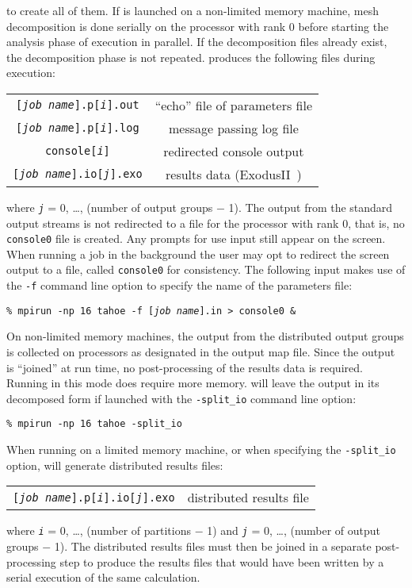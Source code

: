 to create all of them.  If \tahoe is launched on a non-limited memory
machine, mesh decomposition is done serially on the processor with rank 0
before starting the analysis phase of execution in parallel.  If the
decomposition files already exist, the decomposition phase is not repeated. 
\tahoe produces the following files during execution:
\begin{center}
\begin{tabular}[c]{c c}
 \parbox[b]{3.0in}{\raggedleft \texttt{[\textsl{job name}].p[\textsl{i}].out}}
&\parbox[b]{3.0in}{``echo'' file of parameters file}\\
 \parbox[b]{3.0in}{\raggedleft \texttt{[\textsl{job nam}e].p[\textsl{i}].log}}
&\parbox[b]{3.0in}{message passing log file}\\
 \parbox[b]{3.0in}{\raggedleft \texttt{console[\textsl{i}]}}
&\parbox[b]{3.0in}{redirected console output}\\
 \parbox[b]{3.0in}{\raggedleft \texttt{[\textsl{job name}].io[\textsl{j}].exo}}
&\parbox[b]{3.0in}{results data (\textsf{ExodusII}~\cite{ExodusII})}
\end{tabular}
\end{center}
where \texttt{\textsl{j}} = 0, \ldots, (number of output groups $-$ 1).  
The output from the
standard output streams is not redirected to a file for the processor with
rank 0, that is, no \texttt{console0} file is created.  Any prompts for use input
still appear on the screen.  When running a job in the background the user
may opt to redirect the screen output to a file, called \texttt{console0} for
consistency.  The following input makes use of the \texttt{-f} command line option
to specify the name of the parameters file:
\begin{center}
\texttt{\% mpirun -np 16 tahoe -f [\textsl{job name}].in \textgreater~console0 \&}
\end{center}
On non-limited memory machines, the output from the distributed output
groups is collected on processors as designated in the output map file. 
Since the output is ``joined'' at run time, no post-processing of the results
data is required.  Running \tahoe in this mode does require more memory. 
\tahoe will leave the output in its decomposed form if launched with the
\texttt{-split\_io} command line option:
\begin{center}
\texttt{\% mpirun -np 16 tahoe -split\_io}
\end{center}
When running on a limited memory machine, or when specifying the 
\texttt{-split\_io}
option, \tahoe will generate distributed results files:
\begin{center}
\begin{tabular}[c]{c c}
 \parbox[b]{3.0in}{\raggedleft \texttt{[\textsl{job name}].p[\textsl{i}].io[\textsl{j}].exo}}
&\parbox[b]{3.0in}{distributed results file}
\end{tabular}
\end{center}
where \texttt{\textsl{i}} = 0, \ldots, (number of partitions $-$ 1) and 
\texttt{\textsl{j}} = 0, \ldots, (number of output
groups $-$ 1).  The distributed results files must then be joined in a
separate post-processing step to produce the results files that would have
been written by a serial execution of the same calculation.

